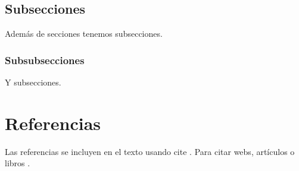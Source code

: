 \subsection{Subsecciones}

Además de secciones tenemos subsecciones.

\subsubsection{Subsubsecciones}

Y subsecciones. 


\section{Referencias}

Las referencias se incluyen en el texto usando cite \cite{wiki:latex}. Para citar webs, artículos o libros \cite{koza92}.


